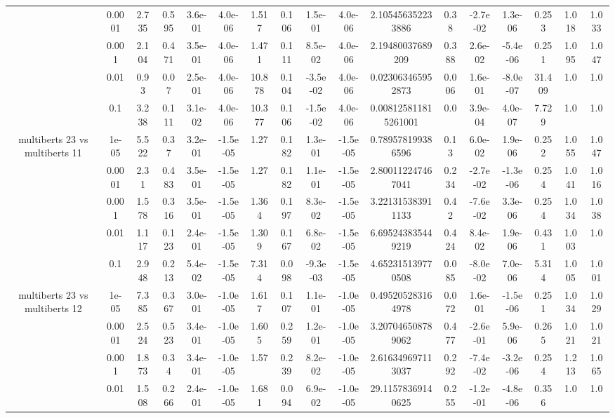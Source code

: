 \begin{tabular}{|c|c|c|c|c|c|c|c|c|c|c|c|c|c|c|c|c|}
 & 0.0001 & 2.735 & 0.595 & 3.6e-01 & 4.0e-06 & 1.517 & 0.106 & 1.5e-01 & 4.0e-06 & 2.105456352233886 & 0.38 & -2.7e-02 & 1.3e-06 & 0.253 & 1.018 & 1.033 \\
 & 0.001 & 2.104 & 0.471 & 3.5e-01 & 4.0e-06 & 1.471 & 0.111 & 8.5e-02 & 4.0e-06 & 2.19480037689209 & 0.388 & 2.6e-02 & -5.4e-06 & 0.251 & 1.095 & 1.047 \\
 & 0.01 & 0.93 & 0.07 & 2.5e-01 & 4.0e-06 & 10.878 & 0.104 & -3.5e-02 & 4.0e-06 & 0.023063465952873 & 0.006 & 1.6e-01 & -8.0e-07 & 31.409 & 1.0 & 1.0 \\
 & 0.1 & 3.238 & 0.111 & 3.1e-02 & 4.0e-06 & 10.377 & 0.106 & -1.5e-02 & 4.0e-06 & 0.008125811815261001 & 0.0 & 3.9e-04 & 4.0e-07 & 7.729 & 1.0 & 1.0 \\
\hline
\multirow{5}{*}{multiberts 23 vs multiberts 11} & 1e-05 & 5.522 & 0.37 & 3.2e-01 & -1.5e-05 & 1.27 & 0.182 & 1.3e-01 & -1.5e-05 & 0.789578199386596 & 0.13 & 6.0e-02 & 1.9e-06 & 0.252 & 1.055 & 1.047 \\
 & 0.0001 & 2.31 & 0.483 & 3.5e-01 & -1.5e-05 & 1.27 & 0.182 & 1.1e-01 & -1.5e-05 & 2.800112247467041 & 0.234 & -2.7e-02 & -1.3e-06 & 0.254 & 1.041 & 1.016 \\
 & 0.001 & 1.578 & 0.316 & 3.5e-01 & -1.5e-05 & 1.364 & 0.197 & 8.3e-02 & -1.5e-05 & 3.221315383911133 & 0.42 & -7.6e-02 & 3.3e-06 & 0.254 & 1.034 & 1.038 \\
 & 0.01 & 1.117 & 0.123 & 2.4e-01 & -1.5e-05 & 1.309 & 0.167 & 6.8e-02 & -1.5e-05 & 6.695243835449219 & 0.424 & 8.4e-02 & 1.9e-06 & 0.431 & 1.003 & 1.0 \\
 & 0.1 & 2.948 & 0.213 & 5.4e-02 & -1.5e-05 & 7.314 & 0.098 & -9.3e-03 & -1.5e-05 & 4.652315139770508 & 0.085 & -8.0e-02 & 7.0e-06 & 5.314 & 1.005 & 1.001 \\
\hline
\multirow{5}{*}{multiberts 23 vs multiberts 12} & 1e-05 & 7.385 & 0.367 & 3.0e-01 & -1.0e-05 & 1.617 & 0.107 & 1.1e-01 & -1.0e-05 & 0.495205283164978 & 0.072 & 1.6e-01 & -1.5e-06 & 0.251 & 1.034 & 1.029 \\
 & 0.0001 & 2.524 & 0.523 & 3.4e-01 & -1.0e-05 & 1.605 & 0.259 & 1.2e-01 & -1.0e-05 & 3.207046508789062 & 0.477 & -2.6e-01 & 5.9e-06 & 0.265 & 1.021 & 1.021 \\
 & 0.001 & 1.873 & 0.34 & 3.4e-01 & -1.0e-05 & 1.57 & 0.239 & 8.2e-02 & -1.0e-05 & 2.616349697113037 & 0.292 & -7.4e-02 & -3.2e-06 & 0.254 & 1.213 & 1.065 \\
 & 0.01 & 1.508 & 0.266 & 2.4e-01 & -1.0e-05 & 1.681 & 0.094 & 6.9e-02 & -1.0e-05 & 29.11578369140625 & 0.255 & -1.2e-01 & -4.8e-06 & 0.356 & 1.0 & 1.0 \\

\end{tabular}
